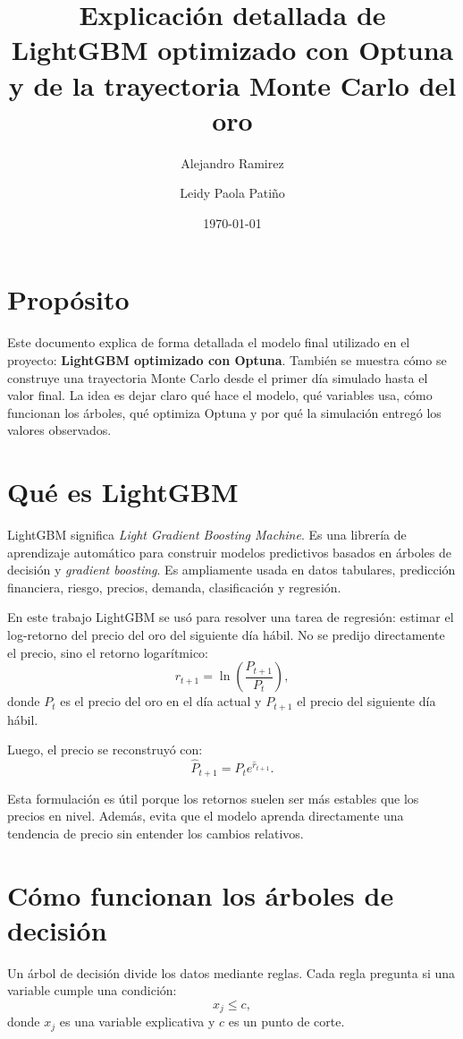 \documentclass[12pt,letterpaper]{article}
\title{Explicación detallada de LightGBM optimizado con Optuna y de la trayectoria Monte Carlo del oro}
\author{Alejandro Ramirez \and Leidy Paola Patiño}
\date{\today}
\begin{document}
\maketitle

\section{Propósito}
Este documento explica de forma detallada el modelo final utilizado en el proyecto: \textbf{LightGBM optimizado con Optuna}. También se muestra cómo se construye una trayectoria Monte Carlo desde el primer día simulado hasta el valor final. La idea es dejar claro qué hace el modelo, qué variables usa, cómo funcionan los árboles, qué optimiza Optuna y por qué la simulación entregó los valores observados.

\section{Qué es LightGBM}
LightGBM significa \textit{Light Gradient Boosting Machine}. Es una librería de aprendizaje automático para construir modelos predictivos basados en árboles de decisión y \textit{gradient boosting}. Es ampliamente usada en datos tabulares, predicción financiera, riesgo, precios, demanda, clasificación y regresión.

En este trabajo LightGBM se usó para resolver una tarea de regresión: estimar el log-retorno del precio del oro del siguiente día hábil. No se predijo directamente el precio, sino el retorno logarítmico:
\begin{equation}
r_{t+1}=\ln\left(\frac{P_{t+1}}{P_t}\right),
\end{equation}
donde $P_t$ es el precio del oro en el día actual y $P_{t+1}$ el precio del siguiente día hábil.

Luego, el precio se reconstruyó con:
\begin{equation}
\hat{P}_{t+1}=P_t e^{\hat{r}_{t+1}}.
\end{equation}

Esta formulación es útil porque los retornos suelen ser más estables que los precios en nivel. Además, evita que el modelo aprenda directamente una tendencia de precio sin entender los cambios relativos.

\section{Cómo funcionan los árboles de decisión}
Un árbol de decisión divide los datos mediante reglas. Cada regla pregunta si una variable cumple una condición:
\begin{equation}
x_j \leq c,
\end{equation}
donde $x_j$ es una variable explicativa y $c$ es un punto de corte.
\end{document}
